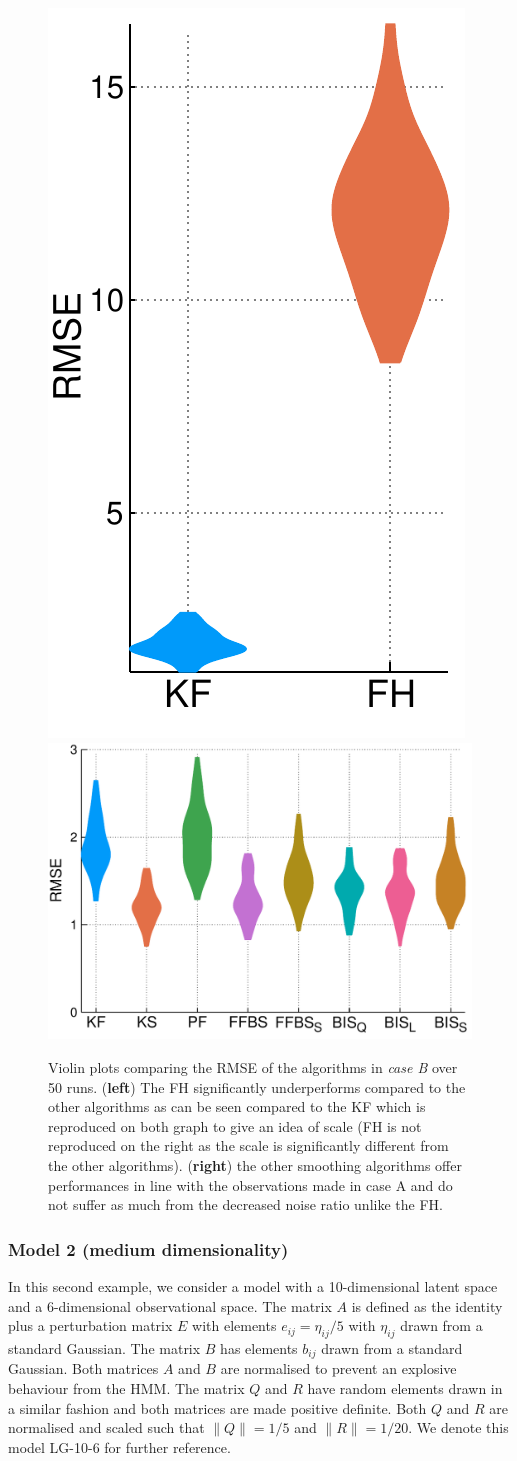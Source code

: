 \begin{figure}[!h]
\center
\includegraphics[width=.24\textwidth]{figures/tfs/comparison_caseB_fh+kf}
\includegraphics[width=.61\textwidth]{figures/tfs/comparison_caseB}
\caption{\label{comp-smoothing-B}Violin plots comparing the RMSE of the algorithms in \emph{case B} over 50 runs. (\textbf{left}) The FH significantly underperforms  compared to the other algorithms as can be seen compared to the KF which is reproduced on both graph to give an idea of scale (FH is not reproduced on the right as the scale is significantly different from the other algorithms). (\textbf{right}) the other smoothing algorithms offer performances in line with the observations made in case A and do not suffer as much from the decreased noise ratio unlike the FH.}
\end{figure}


\subsubsection{Model 2 (medium dimensionality)}
In this second example, we consider a model with a 10-dimensional latent space and a 6-dimensional observational space. The matrix $A$ is defined as the identity plus a perturbation matrix $E$ with elements $e_{ij}=\eta_{ij}/5$ with $\eta_{ij}$ drawn from a standard Gaussian. The matrix $B$ has elements $b_{ij}$ drawn from a standard Gaussian. Both matrices $A$ and $B$ are normalised to prevent an explosive behaviour from the HMM. The matrix $Q$ and $R$ have random elements drawn in a similar fashion and both matrices are made positive definite. Both $Q$ and $R$ are normalised and scaled such that $\| Q\| = 1/5$ and $\| R\| = 1/20$. We denote this model LG-10-6 for further reference.

